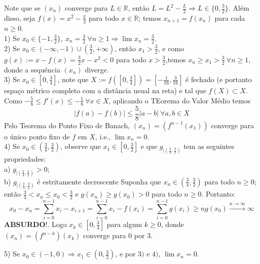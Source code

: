 Note que se $(x_n)$ converge para $L\in \mathbb{R}$, então $L=L^2-\frac{L}{2}\Rightarrow L\in\{0,\frac{3}{2}\}$. Além disso, seja $f(x)=x^2-\frac{x}{2}$ para todo $x\in \mathbb{R}$; temos $x_{n+1}=f(x_n)$ para cada $n\ge 0$.\\

1) Se $x_0\in \{-1,\frac{3}{2}\},\ x_n=\frac{3}{2}\ \forall n\ge 1\Rightarrow \lim x_n=\frac{3}{2}$.\\

2) Se $x_0\in (-\infty,-1)\cup (\frac{3}{2},+\infty)$, então $x_1>\frac{3}{2}$, e como $g(x):=x-f(x)=\frac{3}{2}x-x^2<0$ para todo $x>\frac{3}{2}$,temos $x_n\ge x_1>\frac{3}{2}\ \forall n\ge 1$, donde a sequência $(x_n)$ diverge.\\

3) Se $x_0\in \left[0,\frac{3}{4}\right]$, note que $X:=f\left(\left[0,\frac{3}{4}\right]\right)=\left[-\frac{1}{16},\frac{3}{16}\right]$ é fechado (e portanto espaço métrico completo com a distância usual na reta) e tal que $f(X)\subset X$. Como $-\frac{5}{8}\le f'(x)\le -\frac{1}{8}\ \forall x\in X$, aplicando o TEorema do Valor Médio temos
$$|f(a)-f(b)|\le \frac{5}{8}|a-b|\ \forall a,b\in X$$
Pelo Teorema do Ponto Fixo de Banach, $(x_n)=(f^{n-1}(x_1))$ converge para o único ponto fixo de $f$ em $X$, i.e., $\lim x_n=0$.\\

4) Se $x_0\in \left(\frac{3}{4},\frac{3}{2}\right)$, observe que  $x_1\in \left[0,\frac{3}{2}\right]$ e que $g_{|\left(\frac{3}{4},\frac{3}{2}\right)}$ tem as seguintes propriedades:\\
a) $g_{|\left(\frac{3}{4},\frac{3}{2}\right)}>0$;\\
b) $g_{|\left(\frac{3}{4},\frac{3}{2}\right)}$ é estritamente decrescente
Suponha que $x_n\in \left(\frac{3}{4},\frac{3}{2}\right)$ para todo $n\ge 0$; então $\frac{3}{4}<x_n\le x_0<\frac{3}{2}$ e $g(x_n)\ge g(x_0)>0$ para todo $n\ge 0$. Portanto:
$$x_0-x_n=\sum_{i=0}^{n-1} x_i-x_{i+1}=\sum_{i=0}^{n-1} x_i-f(x_i)=\sum_{i=0}^{n-1} g(x_i)\ge ng(x_0)\overset{n\to \infty}{\rightarrow} \infty$$
$\textbf{ABSURDO!}$. Logo $x_k\in \left[0,\frac{3}{4}\right]$ para algum $k\ge 0$, donde $(x_n)=(f^{n-k})(x_k)$ converge para $0$ por $3$.

5) Se $x_0\in (-1,0)\Rightarrow x_1\in \left(0,\frac{3}{2}\right)$, e por $3)$ e $4)$, $\lim x_n=0$.